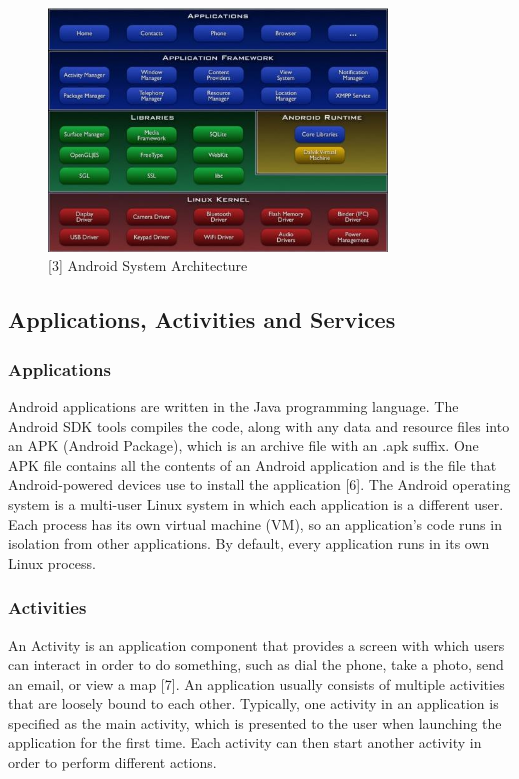 \documentclass[12pt]{uthesis-v12}  %
\begin{document}
			\begin{figure}[h]
				\centering
				\includegraphics[width = 90mm]{images/androidSystemArchitecture.jpg}
				\caption[Android System Architecture]{[3] Android System Architecture}
			\end{figure}
			
		\subsection{Applications, Activities and Services}
		
			\subsubsection{Applications}
			Android applications are written in the Java programming language. The Android SDK tools compiles the code, along with any data and resource files into an APK (Android Package), which is an archive file with an .apk suffix. One APK file contains all the contents of an Android application and is the file that Android-powered devices use to install the application [6]. The Android operating system is a multi-user Linux system in which each application is a different user. Each process has its own virtual machine (VM), so an application's code runs in isolation from other applications. By default, every application runs in its own Linux process.
			
			\subsubsection{Activities}
			An Activity is an application component that provides a screen with which users can interact in order to do something, such as dial the phone, take a photo, send an email, or view a map [7]. An application usually consists of multiple activities that are loosely bound to each other. Typically, one activity in an application is specified as the main activity, which is presented to the user when launching the application for the first time. Each activity can then start another activity in order to perform different actions.
			
\end{document}
